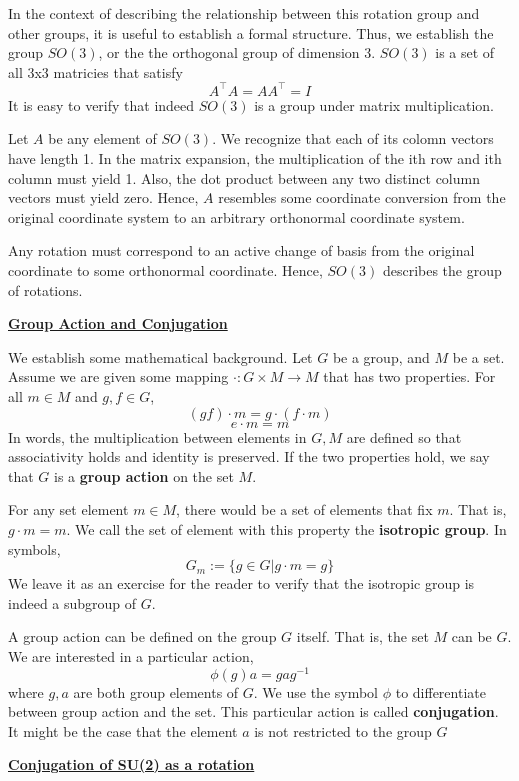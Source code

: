 \documentclass{article}
\newcommand{\new}[1]{
    \vspace{2mm}
    \noindent
    \textbf{
    \underline{#1}}
}
\begin{document}
In the context of describing the relationship between this 
rotation group and other groups, it is useful to establish 
a formal structure. Thus, we establish the group $SO(3)$, or the 
the orthogonal group of dimension 3. $SO(3)$ is a set of all 
3x3 matricies that satisfy 
\[
    A^\intercal A = A A^\intercal = I
\]
It is easy to verify that indeed $SO(3)$ is a group under 
matrix multiplication.  

Let $A$ be any element of $SO(3)$. We recognize that each of 
its colomn vectors have length 1. In the matrix expansion, 
the multiplication of the ith row and ith column must yield 1. 
Also, the dot product between any two distinct column vectors 
must yield zero. Hence, $A$ resembles some coordinate conversion 
from the original coordinate system to an arbitrary orthonormal 
coordinate system. 

Any rotation must correspond to an active change of basis 
from the original coordinate to some orthonormal coordinate. 
Hence, $SO(3)$ describes the group of rotations. 


\new{Group Action and Conjugation}

We establish some mathematical background. Let $G$ be a 
group, and $M$ be a set. Assume we are given some mapping 
$\cdot :G\times M \rightarrow M$ that has two properties. 
For all $m \in M$ and $g, f \in G$, 
\[
    (g f) \cdot m = g \cdot (f \cdot m)
\]
\[
    e \cdot m = m
\]
In words, the multiplication between elements in $G, M$ 
are defined so that associativity holds and identity is preserved. 
If the two properties hold, we say that $G$ is a 
\textbf{group action} on the set $M$. 

For any set element $m \in M$, there would be a set of 
elements that fix $m$. That is, $g\cdot m = m$. We call 
the set of element with this property the \textbf{isotropic group}. 
In symbols, 
\[
    G_m := \{g \in G| g \cdot m = g\}
\]
We leave it as an exercise for the reader to verify that 
the isotropic group is indeed a subgroup of $G$. 

A group action can be defined on the group $G$ itself. That is, 
the set $M$ can be $G$. We are interested in a particular action, 
\[
    \phi(g) a = g a g^{-1}
\]
where $g, a$ are both group elements of $G$. We use the 
symbol $\phi$ to differentiate between group action 
and the set.
This particular action is called 
\textbf{conjugation}. 
It might be the case that the element $a$ is not restricted 
to the group $G$

\new{Conjugation of SU(2) as a rotation}
\end{document}
